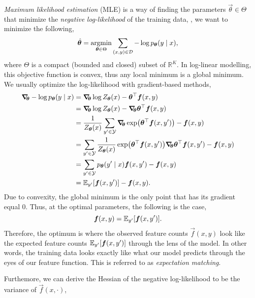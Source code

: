 \textit{Maximum likelihood estimation} (MLE) is a way of finding the parameters
$\vec{\theta}\in\Theta$ that minimize the \textit{negative log-likelihood} of
the training data, \ie, we want to minimize the following, \[
  \hat{\bm{\theta}} = \operatorname*{argmin}_{\bm{\theta}\in\Theta} \sum_{(x,y)\in\mathcal{D}} -\log p_{\bm{\theta}}(y\mid x)
,\]
where $\Theta$ is a compact (bounded and closed) subset of
$\mathbb{R}^K$.
In log-linear modelling, this objective function is convex, thus any local
minimum is a global minimum. We usually optimize the log-likelihood with
gradient-based methods,
\begin{align*}
  \grad{- \log p_{\vec{\theta}}(y \mid x)}{\vec{\theta}} &= \grad{\log Z_{\vec{\theta}}(x) - \transpose{\vec{\theta}} \vec{f}(x,y)}{\vec{\theta}} \\ 
  &= \grad{\log Z_{\vec{\theta}}(x)}{\vec{\theta}} - \grad{\transpose{\vec{\theta}} \vec{f}(x,y)}{\vec{\theta}} \\
  &= \frac{1}{Z_{\vec{\theta}}(x)} \sum_{y'\in\mathcal{Y}} \grad{\exp \lft( \transpose{\vec{\theta}} \vec{f}(x,y') \rgt)}{\vec{\theta}} - \vec{f}(x,y) \\
  &= \sum_{y'\in\mathcal{Y}} \frac{1}{Z_{\vec{\theta}}(x)} \exp \lft( \transpose{\vec{\theta}} \vec{f}(x,y') \rgt) \grad{\transpose{\vec{\theta}} \vec{f}(x,y')}{\vec{\theta}} - \vec{f}(x,y) \\
  &= \sum_{y'\in\mathcal{Y}} p_{\vec{\theta}}(y'\mid x) \vec{f}(x,y') - \vec{f}(x,y) \\
  &= \E_{y'} [\vec{f}(x,y')] - \vec{f}(x,y)
.\end{align*}
Due to convexity, the global minimum is the only point that has its gradient
equal $0$. Thus, at the optimal parameters, the following is the case, \[
  \bm{f}(x,y) = \mathbb{E}_{y'} [\bm{f}(x,y')]
.\]
Therefore, the optimum is where the observed feature counts $\vec{f}(x,y)$ look
like the expected feature counts $\mathbb{E}_{y'} [\bm{f}(x,y')]$ through the lens of
the model. In other words, the training data looks exactly like what our model
predicts through the eyes of our feature function. This is referred to as
\textit{expectation matching}.

Furthemore, we can derive the Hessian of the negative log-likelihood to be the
variance of $\vec{f}(x,\cdot)$,


